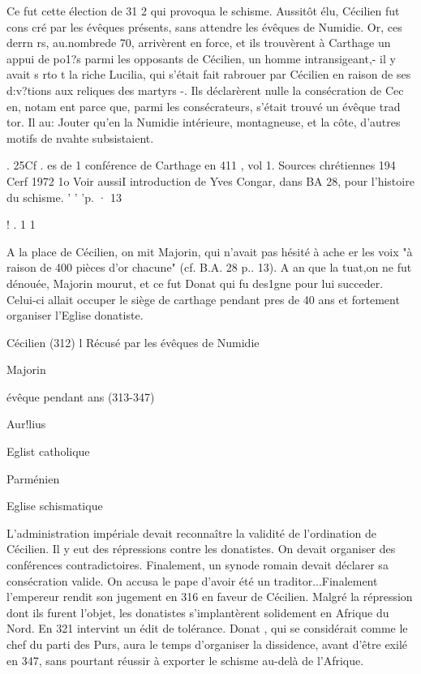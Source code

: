 Ce fut cette élection de 31 2 qui provoqua le schisme.	Aussitôt élu, Cécilien fut cons cré par les évêques présents, sans attendre les évêques	de Numidie. Or, ces derrn rs, au.nombrede 70, arrivèrent en force,	et ils		trouvèrent à Carthage un appui de po1?s parmi les opposants de Cécilien, un homme intransigeant,- il y avait s rto t la riche Lucilia, qui s'était fait rabrouer par Cécilien en raison de ses d:v?tions aux reliques des martyrs -. Ils déclarèrent	nulle la consécration	de Cec   en, notam ent parce que, parmi les consécrateurs, s'était trouvé un évêque
trad tor. Il au: Jouter qu'en la Numidie intérieure, montagneuse, et la côte, d'autres motifs de nvahte subsistaient.


.  25Cf .  es de 1  conférence de Carthage en 411 , vol 1. Sources chrétiennes 194  Cerf 1972	1o
Voir aussiI introduction de Yves Congar, dans BA 28, pour l'histoire du schisme.	'	'	'p.  ·
13
 
 

!
. 1
 	1




A la place de Cécilien, on mit Majorin, qui n'avait pas hésité  à ache er les voix "à raison de 400 pièces d'or chacune" (cf. B.A. 28 p.. 13).  A an que la  tuat,on ne fut dénouée, Majorin mourut, et ce fut  Donat qui fu des1gne pour lui succeder. Celui-ci allait occuper le siège de carthage pendant pres de 40 ans et fortement
organiser l'Eglise donatiste.

 
Cécilien (312)
l
Récusé par
les évêques de Numidie
 
Majorin



évêque pendant
ans (313-347)
 

 
Aur!lius

Eglist catholique
 
Parménien

Eglise schismatique
 

L'administration impériale devait reconnaître la validité de l'ordination de Cécilien. Il y eut des répressions contre les donatistes. On devait organiser des conférences contradictoires. Finalement, un synode romain devait déclarer sa consécration valide. On accusa le pape d'avoir été un traditor...Finalement l'empereur rendit son jugement en 316 en faveur de Cécilien. Malgré la répression dont ils furent l'objet, les donatistes s'implantèrent solidement en Afrique du Nord. En 321 intervint un édit de tolérance. Donat , qui se considérait comme le chef du parti des Purs, aura le temps d'organiser la dissidence, avant d'être exilé en 347, sans pourtant réussir à exporter le schisme au-delà de l'Afrique.

